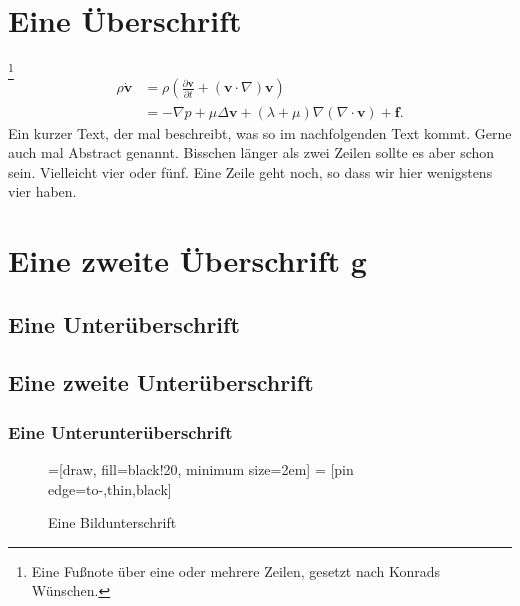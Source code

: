 \section{Eine \"Uberschrift}
\noindent\blindtext[1]\footnote{Eine Fu\ss note \"uber eine oder mehrere Zeilen, gesetzt nach Konrads W\"unschen.}
\begin{align}
	\rho \dot{\mathbf{v}}
	 &= \rho \left( \frac{\partial\mathbf{v}}{\partial t} + (\mathbf{v} \cdot \nabla) \mathbf{v} \right)\\
	 &=-\nabla p + \mu \Delta \mathbf{v} + (\lambda + \mu) \nabla (\nabla \cdot \mathbf{v})+\mathbf{f}.
\end{align}
Ein kurzer Text, der mal beschreibt, was so im nachfolgenden Text kommt. Gerne auch mal Abstract genannt. Bisschen l\"anger als zwei Zeilen sollte es aber schon sein. Vielleicht vier oder f\"unf. Eine Zeile geht noch, so dass wir hier wenigstens vier haben.

\section{Eine zweite \"Uberschrift g}
\subsection{Eine Unter\"uberschrift}
\blindtext

\blindtext

\subsection{Eine zweite Unter\"uberschrift}
\subsubsection{Eine Unterunter\"uberschrift}
\begin{figure}
\centering
{}=[draw, fill=black!20, minimum size=2em]
 = [pin edge={to-,thin,black}]
\caption{Eine Bildunterschrift}
\end{figure}
\blindtext[2]
